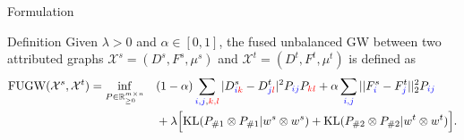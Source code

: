 \documentclass{beamer}
\newcommand{\fugw}{\text{FUGW}}
\newcommand{\kl}{\text{KL}}
\newcommand{\cX}{\mathcal X}
\newcommand{\bbR}{\mathbb R}
\begin{document}
\begin{frame}{Formulation}
\scriptsize
\vspace{-0.7cm}
\begin{block}{Definition}
  Given $\lambda > 0$ and $\alpha \in [0, 1]$, the fused unbalanced GW
  between two attributed graphs $\cX^s = (D^s, F^s, \mu^s)$ and
  $\cX^t = (D^t, F^t, \mu^t)$ is defined as
\begin{align*}
  \fugw(\cX^s, \cX^t) = \inf_{P \in \bbR^{m \times n}_{\geq 0}} \quad
  &(1 - \alpha) \sum_{{\color{blue}{i, j}},{\color{red}{k, l}}} |
  D^s_{{\color{blue}{i}}{\color{red}{k}}} - D^t_{{\color{blue}{j}}{\color{red}{l}}}|^2
  P_{\color{blue}{ij}} P_{\color{red}{kl}}
  + \alpha \sum_{{\color{blue}{i, j}}} || F^s_{\color{blue}{i}} - F^t_{\color{blue}{j}}||_2^2 P_{\color{blue}{ij}} \\
  &+ \lambda \Big[ \kl(P_{\# 1} \otimes P_{\# 1} \vert w^s \otimes w^s)
  + \kl(P_{\# 2} \otimes P_{\# 2} \vert w^t \otimes w^t) \Big].
\end{align*}
\end{block}



\end{frame}
\end{document}
